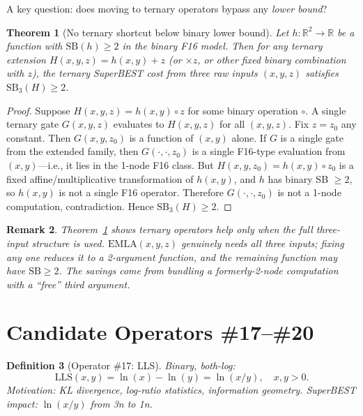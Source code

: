 \documentclass[11pt]{article}
\newtheorem{theorem}{Theorem}
\newtheorem{definition}[theorem]{Definition}
\newtheorem{remark}[theorem]{Remark}
\begin{document}
A key question: does moving to ternary operators bypass any \emph{lower bound}?

\begin{theorem}[No ternary shortcut below binary lower bound]
\label{thm:nogo}
Let $h : \mathbb{R}^2 \to \mathbb{R}$ be a function with
$\mathrm{SB}(h) \geq 2$ in the binary F16 model.
Then for any ternary extension $H(x,y,z) = h(x,y) + z$ (or $\times z$, or other
fixed binary combination with $z$), the ternary SuperBEST cost from
\emph{three raw inputs} $(x,y,z)$ satisfies $\mathrm{SB}_3(H) \geq 2$.
\end{theorem}

\begin{proof}
Suppose $H(x,y,z) = h(x,y) \circ z$ for some binary operation $\circ$.
A single ternary gate $G(x,y,z)$ evaluates to $H(x,y,z)$ for all $(x,y,z)$.
Fix $z = z_0$ any constant. Then $G(x,y,z_0)$ is a function of $(x,y)$ alone.
If $G$ is a single gate from the extended family, then $G(\cdot,\cdot,z_0)$
is a single F16-type evaluation from $(x,y)$---i.e., it lies in the 1-node F16 class.
But $H(x,y,z_0) = h(x,y) \circ z_0$ is a fixed affine/multiplicative transformation
of $h(x,y)$, and $h$ has binary SB $\geq 2$, so $h(x,y)$ is not a single F16 operator.
Therefore $G(\cdot,\cdot,z_0)$ is not a 1-node computation, contradiction.
Hence $\mathrm{SB}_3(H) \geq 2$.
\end{proof}

\begin{remark}
Theorem~\ref{thm:nogo} shows ternary operators help only when the \emph{full} three-input
structure is used. $\mathrm{EMLA}(x,y,z)$ genuinely needs all three inputs; fixing any
one reduces it to a 2-argument function, and the remaining function may have $\mathrm{SB} \geq 2$.
The savings come from \emph{bundling} a formerly-2-node computation with a ``free'' third argument.
\end{remark}

\section{Candidate Operators \#17--\#20}
\label{sec:candidates}

\begin{definition}[Operator \#17: LLS]
Binary, both-log:
\[
  \mathrm{LLS}(x,y) = \ln(x) - \ln(y) = \ln(x/y), \quad x,y > 0.
\]
Motivation: KL divergence, log-ratio statistics, information geometry.
SuperBEST impact: $\ln(x/y)$ from 3n to 1n.
\end{definition}
\end{document}

